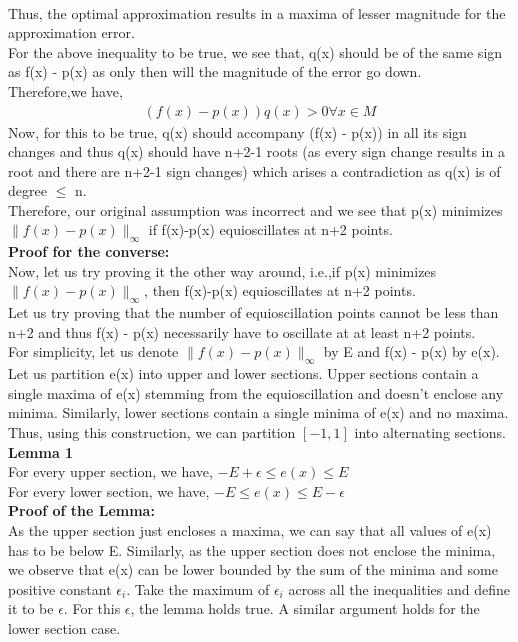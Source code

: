 \documentclass[letterpaper]{exam}
\begin{document}
\begin{questions}
\begin{solution}
\begin{align*}
\end{align*}
Thus, the optimal approximation results in a maxima of lesser magnitude for the approximation error.\\
For the above inequality to be true, we see that, q(x) should be of the same sign as f(x) - p(x) as only then will the magnitude of the error go down.\\
Therefore,we have,
\begin{align*}
    (f(x) - p(x))q(x) > 0 \forall x \in M
\end{align*}
Now, for this to be true, q(x) should accompany (f(x) - p(x)) in all its sign changes and thus q(x) should have n+2-1 roots (as every sign change results in a root and there are n+2-1 sign changes) which arises a contradiction as q(x) is of degree $\leq$ n.\\
Therefore, our original assumption was incorrect and we see that p(x) minimizes $\parallel f(x)-p(x)\parallel_{\infty}$ if f(x)-p(x) equioscillates at n+2 points. 
\\
\textbf{Proof for the converse:}
\\
Now, let us try proving it the other way around, i.e.,if p(x) minimizes $\parallel f(x)-p(x)\parallel_{\infty}$, then f(x)-p(x) equioscillates at n+2 points. \\
Let us try proving that the number of equioscillation points cannot be less than n+2 and thus f(x) - p(x) necessarily have to oscillate at at least n+2 points.\\
For simplicity, let us denote $\|f(x) - p(x)\|_{\infty}$ by E and f(x) - p(x) by e(x).\\
Let us partition e(x) into upper and lower sections.  Upper sections contain a single maxima of e(x) stemming from the equioscillation and doesn't enclose any minima. Similarly, lower sections contain a single minima of e(x) and no maxima. Thus, using this construction, we can partition $[-1,1]$ into alternating sections.\\
\textbf{Lemma 1}\label{L1}\\
For every upper section, we have, $-E+\epsilon \leq e(x) \leq E$\\
For every lower section, we have, $-E \leq e(x) \leq E - \epsilon$
\\
\textbf{Proof of the Lemma:}\\
As the upper section just encloses a maxima, we can say that all values of e(x) has to be below E. Similarly, as the upper section does not enclose the minima, we observe that e(x) can be lower bounded by the sum of the minima and some positive constant $\epsilon_{i}$. Take the maximum of $\epsilon_{i}$ across all the inequalities and define it to be $\epsilon$. For this $\epsilon$, the lemma holds true. A similar argument holds for the lower section case.

\end{solution}
\end{questions}
\end{document}
